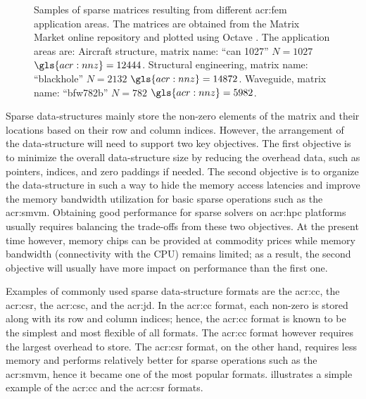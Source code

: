 \begin{figure}
{	}
	\caption[Samples of sparse matrices.]{Samples of sparse matrices resulting from different \gls{acr:fem} application areas. The matrices are obtained from the Matrix Market online repository \cite{bib:matrixMarket} and plotted using Octave \cite{bib:octave2012}. The application areas are: \protect{} Aircraft structure, matrix name: ``can 1027'' $N=1027$ $\gls{acr:nnz}=12444$. \protect{} Structural engineering, matrix name: ``blackhole'' $N=2132$ $\gls{acr:nnz}=14872$.  \protect{} Waveguide, matrix name: ``bfw782b'' $N=782$ $\gls{acr:nnz}=5982$.}
	\label{fig:sparseMat}
\end{figure}

Sparse data-structures mainly store the non-zero elements of the matrix and their locations based on their row and column indices.
However, the arrangement of the data-structure will need to support two key objectives.
The first objective is to minimize the overall data-structure size by reducing the overhead data, such as pointers, indices, and zero paddings if needed.
The second objective is to organize the data-structure in such a way to hide the memory access latencies and improve the memory bandwidth utilization for basic sparse operations such as the \gls{acr:smvm}.
Obtaining good performance for sparse solvers on \gls{acr:hpc} platforms usually requires balancing the trade-offs from these two objectives.
At the present time however, memory chips can be provided at commodity prices while memory bandwidth (connectivity with the CPU) remains limited; as a result, the second objective will usually have more impact on performance than the first one.

Examples of commonly used sparse data-structure formats are the \gls{acr:cc}, the \gls{acr:csr}, the \gls{acr:csc}, and the \gls{acr:jd}.
In the \gls{acr:cc} format, each non-zero is stored along with its row and column indices; hence, the \gls{acr:cc} format is known to be the simplest and most flexible of all formats.
The \gls{acr:cc} format however requires the largest overhead to store.
The \gls{acr:csr} format, on the other hand, requires less memory and performs relatively better for sparse operations such as the \gls{acr:smvm}, hence it became one of the most popular formats.
 illustrates a simple example of the \gls{acr:cc} and the \gls{acr:csr} formats.

